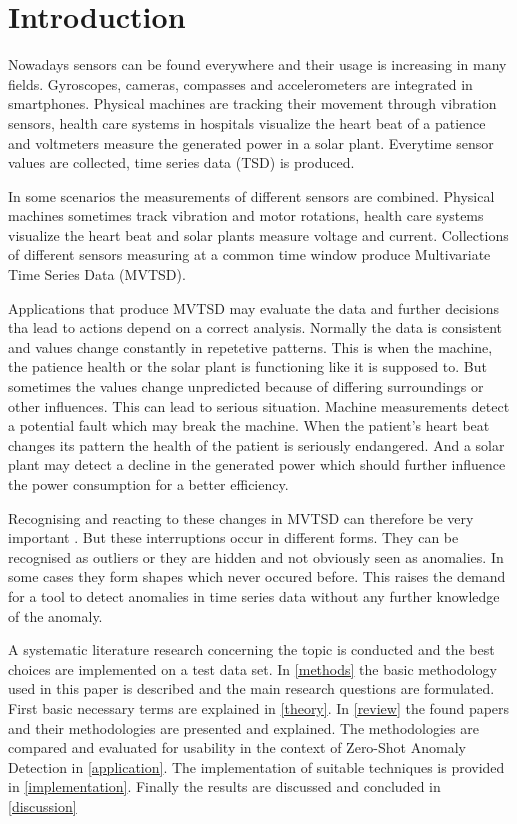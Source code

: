 \section{Introduction}\label{intro}
Nowadays sensors can be found everywhere and their usage is increasing in many fields. Gyroscopes, cameras, compasses and accelerometers are integrated in smartphones. Physical machines are tracking their movement through vibration sensors, health care systems in hospitals visualize the heart beat of a patience and voltmeters measure the generated power in a solar plant. Everytime sensor values are collected, time series data (TSD) is produced.

In some scenarios the measurements of different sensors are combined. Physical machines sometimes track vibration and motor rotations, health care systems visualize the heart beat and solar plants measure voltage and current.
Collections of different sensors measuring at a common time window produce Multivariate Time Series Data (MVTSD).

Applications that produce MVTSD may evaluate the data and further decisions tha lead to actions depend on a correct analysis.
Normally the data is consistent and values change constantly in repetetive patterns. This is when the machine, the patience health or the solar plant is functioning like it is supposed to. But sometimes the values change unpredicted because of differing surroundings or other influences. This can lead to serious situation. Machine measurements detect a potential fault which may break the machine. When the patient's heart beat changes its pattern the health of the patient is seriously endangered. And a solar plant may detect a decline in the generated power which should further influence the power consumption for a better efficiency.

Recognising and reacting to these changes in MVTSD can therefore be very important%
. But these interruptions occur in different forms. They can be recognised as outliers or they are hidden and not obviously seen as anomalies. In some cases they form shapes which never occured before. This raises the demand for a tool to detect anomalies in time series data without any further knowledge of the anomaly.


A systematic literature research concerning the topic is conducted and the best choices are implemented on a test data set. In \autoref{methods} the basic methodology used in this paper is described and the main research questions are formulated. First basic necessary terms are explained in \autoref{theory}. In \autoref{review} the found papers and their methodologies are presented and explained. The methodologies are compared and evaluated for usability in the context of Zero-Shot Anomaly Detection in \autoref{application}. The implementation of suitable techniques is provided in \autoref{implementation}. Finally the results are discussed and concluded in \autoref{discussion}
